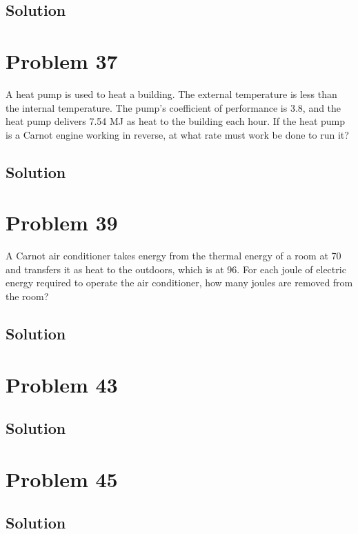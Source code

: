 \documentclass[12pt]{article}
\begin{document}
        \subsection{Solution}

    \section{Problem 37}
        A heat pump is used to heat a building. 
        The external temperature is less than the internal temperature. 
        The pump's coefficient of performance is 3.8, and the heat pump delivers 7.54 MJ as heat to the building each hour. 
        If the heat pump is a Carnot engine working in reverse, at what rate must work be done to run it?

        \subsection{Solution}

    \section{Problem 39}
        A Carnot air conditioner takes energy from the thermal energy of a room at 70\unit{\fahrenheit} and transfers it as heat to the outdoors, which is at 96\unit{\fahrenheit}. 
        For each joule of electric energy required to operate the air conditioner, how many joules are removed from the room?

        \subsection{Solution}

    \section{Problem 43}

        \subsection{Solution}

    \section{Problem 45}

        \subsection{Solution}
\end{document}
